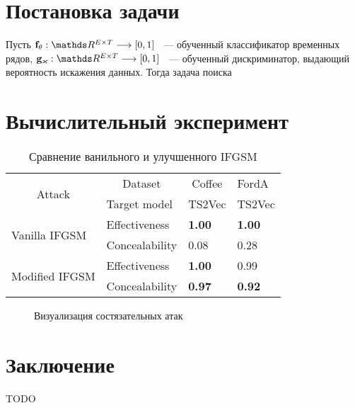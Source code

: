 \documentclass[a4paper, 14pt]{article}
\begin{document}
	
	\section{Постановка задачи}
	Пусть $\bff_\theta: \dR^{E \times T} \longrightarrow [0, 1]$ ~--- обученный классификатор временных рядов, $\bg_\kappa: \dR^{E \times T} \longrightarrow [0, 1]$ ~--- обученный дискриминатор, выдающий вероятность искажения данных.
	Тогда задача поиска 
	
	\section{Вычислительный эксперимент}
	
	\begin{table}[bhtp]
		\caption{Сравнение ванильного и улучшенного IFGSM}
		\begin{tabular}{|l|l|l|l|}
			\hline
			\multicolumn{1}{|c|}{\multirow{2}{*}{Attack}} & \multicolumn{1}{c|}{Dataset} & \multicolumn{1}{c|}{Coffee} & FordA \\ \cline{2-4} 
			\multicolumn{1}{|c|}{}                        & Target model                 & TS2Vec & TS2Vec        \\ \hline
			\multirow{2}{*}{Vanilla IFGSM}                & Effectiveness                & \textbf{1.00}               & \textbf{1.00} \\ \cline{2-4} 
			& Concealability               & 0.08                        & 0.28          \\ \hline
			\multirow{2}{*}{Modified IFGSM}               & Effectiveness                & \textbf{1.00}               & 0.99          \\ \cline{2-4} 
			& Concealability               & \textbf{0.97}               & \textbf{0.92} \\ \hline
		\end{tabular}
	\end{table}
	
	\begin{figure}[bhtp]
		\centering
		\caption{Визуализация состязательных атак}
		\label{fig:spirals}
	\end{figure}
	
	\section{Заключение}
	TODO
	
	
	
	
\end{document}
